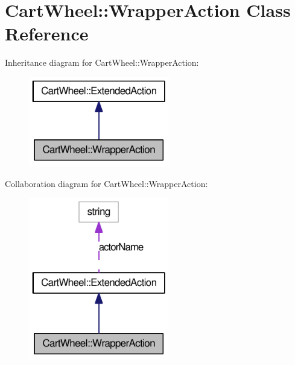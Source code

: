 \hypertarget{classCartWheel_1_1WrapperAction}{
\section{CartWheel::WrapperAction Class Reference}
\label{classCartWheel_1_1WrapperAction}
}


Inheritance diagram for CartWheel::WrapperAction:\nopagebreak
\begin{figure}[H]
\begin{center}
\leavevmode
\includegraphics[width=174pt]{classCartWheel_1_1WrapperAction__inherit__graph}
\end{center}
\end{figure}


Collaboration diagram for CartWheel::WrapperAction:\nopagebreak
\begin{figure}[H]
\begin{center}
\leavevmode
\includegraphics[width=174pt]{classCartWheel_1_1WrapperAction__coll__graph}
\end{center}
\end{figure}
